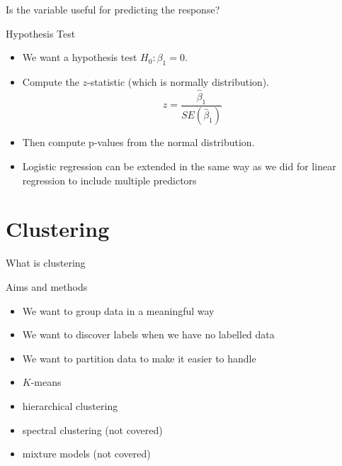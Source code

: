 \documentclass{bredelebeamer}
\begin{document}
\begin{frame}{Is the variable useful for predicting the response?}

\begin{exampleblock}{Hypothesis Test}

\begin{itemize}
	\item We want a hypothesis test $H_0: \beta_1 = 0$.
	\item Compute the $z$-statistic (which is normally distribution).
	\begin{equation}
	z = \frac{\hat{\beta}_1}{SE(\hat{\beta}_1)}
	\end{equation}
	\item Then compute p-values from the normal distribution.
	\item Logistic regression can be extended in the same way as we did for linear regression to include multiple predictors
\end{itemize}

\end{exampleblock}

\end{frame}

\section{Clustering}

\begin{frame}{What is clustering}
\begin{exampleblock}{Aims and methods}
	
	\begin{itemize}
		\item We want to group data in a meaningful way
		\item We want to discover labels when we have no labelled data
		\item We want to partition data to make it easier to handle
		\item $K$-means
		\item hierarchical clustering
		\item spectral clustering (not covered)
		\item mixture models (not covered)
	\end{itemize}
\end{exampleblock}
\end{frame}
\end{document}
